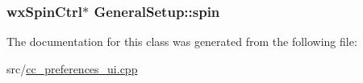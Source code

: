 \hypertarget{a00105_ab8efae9ee6c39a6a518747ed40c224b2}{
\subsubsection[{spin}]{\setlength{\rightskip}{0pt plus 5cm}wx\-Spin\-Ctrl$\ast$ General\-Setup\-::spin\hspace{0.3cm}{\ttfamily [private]}}}\label{a00105_ab8efae9ee6c39a6a518747ed40c224b2}


The documentation for this class was generated from the following file\-:\begin{DoxyCompactItemize}
\item 
src/\hyperlink{a00187}{cc\-\_\-preferences\-\_\-ui.\-cpp}\end{DoxyCompactItemize}
